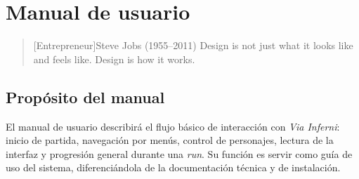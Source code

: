 \chapter{Manual de usuario}

\begin{quotation}[Entrepreneur]{Steve Jobs (1955--2011)}
Design is not just what it looks like and feels like. Design is how it works.
\end{quotation}

\begin{abstract}
Este capítulo se reserva para recoger las instrucciones de uso del videojuego desde la
perspectiva del jugador final.
\end{abstract}

\section{Propósito del manual}
El manual de usuario describirá el flujo básico de interacción con \textit{Via Inferni}:
inicio de partida, navegación por menús, control de personajes, lectura de la interfaz y
progresión general durante una \textit{run}. Su función es servir como guía de uso del
sistema, diferenciándola de la documentación técnica y de instalación.
